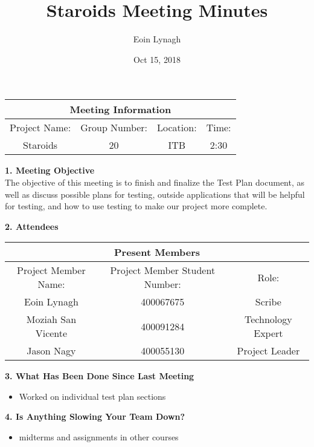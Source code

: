 \documentclass[12pt]{article}
\title{Staroids Meeting Minutes}
\author{Eoin Lynagh}
\date{Oct 15, 2018}
\begin{document}
\maketitle
\begin{center}
 \begin{tabular}{|c | c | c |  c |} 
 \hline
 \multicolumn{4}{|c|}{Meeting Information} \\
\hline
 Project Name: & Group Number: & Location: & Time: \\ 
 \hline
 Staroids & 20 & ITB & 2:30 \\
\hline
\end{tabular}
\end{center}
\begin{flushleft}


\textbf{1. Meeting Objective}\\
The objective of this meeting is to finish and finalize the Test Plan document, as well as discuss possible plans for testing, outside applications that will be helpful for testing, and how to use testing to make our project more complete.

\textbf{2. Attendees}\\
\begin{center}
 \begin{tabular}{|c | c | c | } 
 \hline
 \multicolumn{3}{|c|}{Present Members} \\
\hline
 Project Member Name: & Project Member Student Number: & Role: \\ 
 \hline\hline
 Eoin Lynagh & 400067675 & Scribe \\
\hline
Moziah San Vicente & 400091284 & Technology Expert \\
\hline
 Jason Nagy & 400055130 & Project Leader \\
\hline
\end{tabular}
\end{center}

\textbf{3. What Has Been Done Since Last Meeting}\\
\begin{itemize}
\item Worked on individual test plan sections
\end{itemize}

\textbf{4. Is Anything Slowing Your Team Down?}\\
\begin{itemize}
\item midterms and assignments in other courses
\end{itemize}


\end{flushleft}
\end{document}
